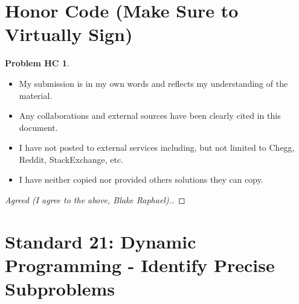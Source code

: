 \documentclass[11pt]{article}
\theoremstyle{definition}
\theoremstyle{definition}
\newtheorem*{requiredHC}{Problem HC}
\theoremstyle{definition}
\begin{document}
\newpage
\section*{Honor Code (Make Sure to Virtually Sign)} \label{HonorCode}
\hypertarget{HonorCode}{}

\begin{requiredHC}
\begin{itemize}
\item My submission is in my own words and reflects my understanding of the material.
\item Any collaborations and external sources have been clearly cited in this document.
\item I have not posted to external services including, but not limited to Chegg, Reddit, StackExchange, etc.
\item I have neither copied nor provided others solutions they can copy.
\end{itemize}

\end{requiredHC}

\begin{proof}[Agreed (I agree to the above, Blake Raphael).]
\end{proof}


\newpage
\setcounter{section}{20}
\section{Standard 21: Dynamic Programming - Identify Precise Subproblems}
\end{document}
